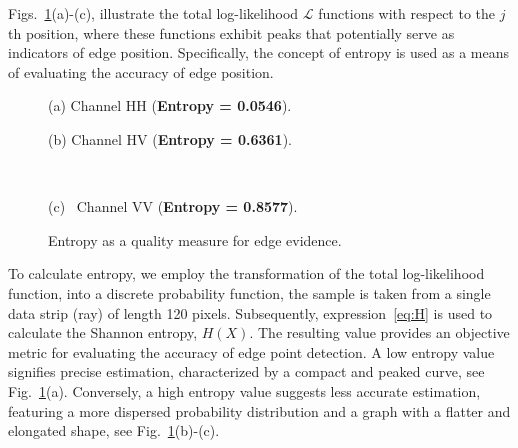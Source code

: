 \documentclass{article}
\begin{document}
Figs.~\ref{fig:entropy1}(a)-(c), illustrate the total log-likelihood $\mathcal L$ functions with respect to the $j$th position, where these functions exhibit peaks that potentially serve as indicators of edge position. Specifically, the concept of entropy is used as a means of evaluating the accuracy of edge position.\vspace{-0.3cm}
\begin{figure}[H]
    \begin{minipage}{0.5\textwidth}
       \begin{minipage}[b]{.5\linewidth}
  \centering
 \centerline{}
  \vspace{-0.1cm}
  \centerline{\footnotesize{ (a) Channel HH (\textbf{Entropy = 0.0546}).}}\medskip
\end{minipage}%
\begin{minipage}[b]{.5\linewidth}
  \centering
\centerline{}
  \vspace{-0.2cm}
  \centerline{\footnotesize{(b) Channel HV (\textbf{Entropy =  0.6361}).}}\medskip
\end{minipage}\\
\hfill 
\vspace{-0.3cm}
 \centering
\begin{minipage}[b]{0.5\linewidth}
  \centering
 \centerline{}
  \vspace{-0.1cm}
  \centerline{\footnotesize{(c) \, Channel VV  (\textbf{Entropy =  0.8577}).}}\medskip
\end{minipage}\vspace{-0.2cm}
       \caption{Entropy as a quality measure for edge evidence.} 
\label{fig:entropy1}
    \end{minipage}%
\end{figure}
\vspace{-0.3cm}
To calculate entropy,  we employ the transformation of the total log-likelihood function, into a discrete probability function, the sample is taken from a single data strip (ray) of length 120 pixels.  Subsequently, expression~\eqref{eq:H} is used to calculate the Shannon entropy, $H(X)$. The resulting value provides an objective metric for evaluating the accuracy of edge point detection. A low entropy value signifies precise estimation, characterized by a compact and peaked curve, see Fig.~\ref{fig:entropy1}(a). Conversely, a high entropy value suggests less accurate estimation, featuring a more dispersed probability distribution and a graph with a flatter and elongated shape, see Fig.~\ref{fig:entropy1}(b)-(c).\par
\end{document}
